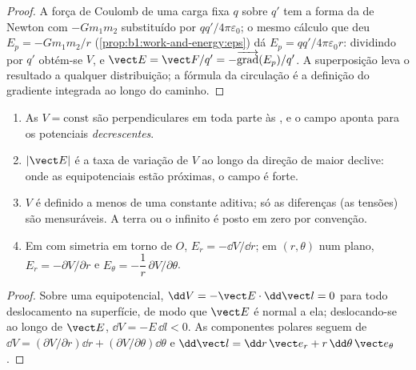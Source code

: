 \begin{proof}
A força de Coulomb de uma carga fixa $q$ sobre $q'$ tem a forma da
 de Newton com $-Gm_1m_2$ substituído por $qq'/4\pi\varepsilon_0$; o mesmo
cálculo que deu $E_p = -Gm_1m_2/r$
(\cref{prop:b1:work-and-energy:eps}) dá $E_p = qq'/4\pi\varepsilon_0r$:
dividindo por $q'$ obtém-se $V$, e $\vect E = \vect F/q' =
-\overrightarrow{\operatorname{grad}}(E_p)/q'$. A superposição leva o
resultado a qualquer distribuição; a fórmula da circulação é a definição
do gradiente integrada ao longo do caminho.
\end{proof}

\begin{proposition}\label{prop:b1:potential-capacitors:reading}
\begin{enumerate}
  \item As \emph{} $V = \text{const}$ são
        perpendiculares em toda parte às , e o campo
        aponta para os potenciais \emph{decrescentes}.
  \item $|\vect E|$ é a taxa de variação de $V$ ao longo da direção de
        maior declive: onde as equipotenciais estão próximas, o campo é forte.
  \item $V$ é definido a menos de uma constante aditiva; só as diferenças
        (as tensões) são mensuráveis. A terra ou o infinito é posto em zero por
        convenção.
  \item Em  com simetria em torno de $O$, $E_r = -\dd V/
        \dd r$; em  $(r, \theta)$ num plano,
        $E_r = -\partial V/\partial r$ e $E_\theta = -\dfrac1r\,\partial V/\partial\theta$.
\end{enumerate}
\end{proposition}

\begin{proof}
Sobre uma equipotencial, $\dd V = -\vect E\cdot\dd\vect l = 0$ para todo
deslocamento na superfície, de modo que $\vect E$ é normal a ela; deslocando-se ao longo de
$\vect E$, $\dd V = -E\,\dd l < 0$. As componentes polares seguem de
$\dd V = (\partial V/\partial r)\dd r + (\partial V/\partial\theta)\dd\theta$ e
$\dd\vect l = \dd r\,\vect e_r + r\,\dd\theta\,\vect e_\theta$.
\end{proof}

